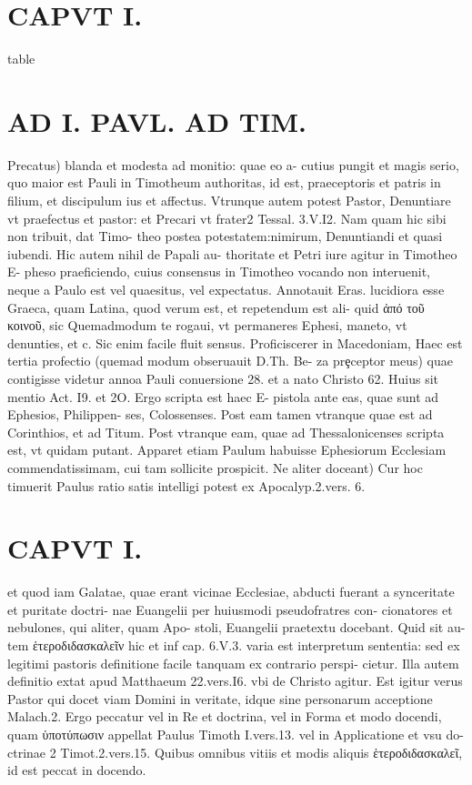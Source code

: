 \documentclass{article}
\begin{document}
\begin{pages}
\section*{CAPVT  I. }
\marginpar{[ p.7 ]}\pstart table  \pend
\section*{AD I. PAVL. AD TIM. }
\marginpar{[ p.8 ]}\pstart Precatus) blanda et modesta ad monitio: quae eo a- cutius pungit et magis serio, quo maior est Pauli in Timotheum authoritas, id est, praeceptoris et patris in filium, et discipulum ius et affectus. Vtrunque autem potest Pastor, Denuntiare vt praefectus et pastor: et Precari vt frater2 Tessal. 3.V.I2. Nam quam hic sibi non tribuit, dat Timo- theo postea potestatem:nimirum, Denuntiandi et quasi iubendi. Hic autem nihil de Papali au- thoritate et Petri iure agitur in Timotheo E- pheso praeficiendo, cuius consensus in Timotheo vocando non interuenit, neque a Paulo est vel quaesitus, vel expectatus. Annotauit Eras. lucidiora esse Graeca, quam Latina, quod verum est, et repetendum est ali- quid ἀπό τοῦ κοινοῦ, sic Quemadmodum te rogaui, vt permaneres Ephesi, maneto, vt denunties, et c. Sic enim facile fluit sensus. Proficiscerer in Macedoniam, Haec est tertia profectio (quemad modum obseruauit D.Th. Be- za prȩceptor meus) quae contigisse videtur annoa Pauli conuersione 28. et a nato Christo 62. Huius sit mentio Act. I9. et 2O. Ergo scripta est haec E- pistola ante eas, quae sunt ad Ephesios, Philippen- ses, Colossenses. Post eam tamen vtranque quae est ad Corinthios, et ad Titum. Post vtranque eam, quae ad Thessalonicenses scripta est, vt quidam putant. Apparet etiam Paulum habuisse Ephesiorum Ecclesiam commendatissimam, cui tam sollicite prospicit. Ne aliter doceant) Cur hoc timuerit Paulus ratio satis intelligi potest ex Apocalyp.2.vers. 6.  \pend
\section*{CAPVT  I. }
\marginpar{[ p.9 ]}\pstart et quod iam Galatae, quae erant vicinae Ecclesiae, abducti fuerant a synceritate et puritate doctri- nae Euangelii per huiusmodi pseudofratres con- cionatores et nebulones, qui aliter, quam Apo- stoli, Euangelii praetextu docebant. Quid sit au- tem ἑτεροδιδασκαλεῖν hic et inf cap. 6.V.3. varia est interpretum sententia: sed ex legitimi pastoris definitione facile tanquam ex contrario perspi- cietur. Illa autem definitio extat apud Matthaeum 22.vers.I6. vbi de Christo agitur. Est igitur verus Pastor qui docet viam Domini in veritate, idque sine personarum acceptione Malach.2. Ergo peccatur vel in Re et doctrina, vel in Forma et modo docendi, quam ὑποτύπωσιν appellat Paulus  Timoth I.vers.13. vel in Applicatione et vsu do- ctrinae 2 Timot.2.vers.15. Quibus omnibus vitiis et modis aliquis ἑτεροδιδασκαλεῖ, id est peccat in docendo.  \pend\pstart {}
{}

\end{pages}
\end{document}

